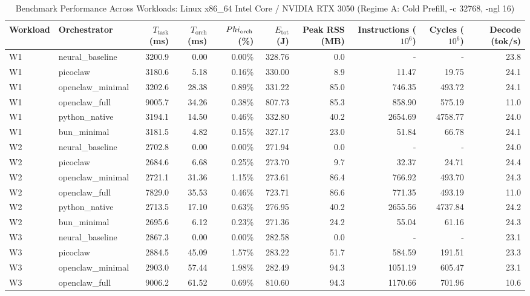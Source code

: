 \begin{table}[t]
\centering\small
\caption{Benchmark Performance Across Workloads: Linux x86_64 Intel Core / NVIDIA RTX 3050 (Regime A: Cold Prefill, -c 32768, -ngl 16)}
\label{tab:linux_master_summary}
\begin{tabular}{llrrrrrrrr}
\toprule
Workload & Orchestrator & $T_{\text{task}}$ (ms) & $T_{\text{orch}}$ (ms) & $\\Phi_{\text{orch}}$ (\%) & $E_{\text{tot}}$ (J) & Peak RSS (MB) & Instructions ($10^6$) & Cycles ($10^6$) & Decode (tok/s) \\
\midrule
W1 & neural\_baseline & 3200.9 & 0.00 & 0.00\% & 328.76 & 0.0 & - & - & 23.8 \\
W1 & picoclaw & 3180.6 & 5.18 & 0.16\% & 330.00 & 8.9 & 11.47 & 19.75 & 24.1 \\
W1 & openclaw\_minimal & 3202.6 & 28.38 & 0.89\% & 331.22 & 85.0 & 746.35 & 493.72 & 24.1 \\
W1 & openclaw\_full & 9005.7 & 34.26 & 0.38\% & 807.73 & 85.3 & 858.90 & 575.19 & 11.0 \\
W1 & python\_native & 3194.1 & 14.50 & 0.46\% & 332.80 & 40.2 & 2654.69 & 4758.77 & 24.0 \\
W1 & bun\_minimal & 3181.5 & 4.82 & 0.15\% & 327.17 & 23.0 & 51.84 & 66.78 & 24.1 \\
\midrule
W2 & neural\_baseline & 2702.8 & 0.00 & 0.00\% & 271.94 & 0.0 & - & - & 24.0 \\
W2 & picoclaw & 2684.6 & 6.68 & 0.25\% & 273.70 & 9.7 & 32.37 & 24.71 & 24.4 \\
W2 & openclaw\_minimal & 2721.1 & 31.36 & 1.15\% & 273.61 & 86.4 & 766.92 & 493.70 & 24.3 \\
W2 & openclaw\_full & 7829.0 & 35.53 & 0.46\% & 723.71 & 86.6 & 771.35 & 493.19 & 11.0 \\
W2 & python\_native & 2713.5 & 17.10 & 0.63\% & 276.95 & 40.2 & 2655.56 & 4737.84 & 24.2 \\
W2 & bun\_minimal & 2695.6 & 6.12 & 0.23\% & 271.36 & 24.2 & 55.04 & 61.16 & 24.3 \\
\midrule
W3 & neural\_baseline & 2867.3 & 0.00 & 0.00\% & 282.58 & 0.0 & - & - & 23.1 \\
W3 & picoclaw & 2884.5 & 45.09 & 1.57\% & 283.22 & 51.7 & 584.59 & 191.51 & 23.3 \\
W3 & openclaw\_minimal & 2903.0 & 57.44 & 1.98\% & 282.49 & 94.3 & 1051.19 & 605.47 & 23.1 \\
W3 & openclaw\_full & 9006.2 & 61.52 & 0.69\% & 810.60 & 94.3 & 1170.66 & 701.96 & 10.6 \\

\end{tabular}
\end{table}
